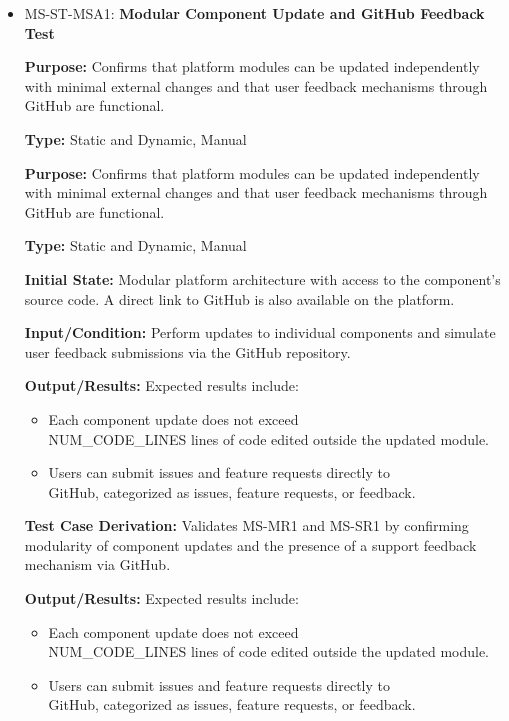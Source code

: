 \documentclass[12pt, titlepage]{article}
\begin{document}
\begin{itemize}
  \item MS-ST-MSA1: \textbf{Modular Component Update and GitHub Feedback Test}
  \begin{mdframed}[linewidth=0.5mm] 
    \textbf{Purpose:} Confirms that platform modules can be updated independently with minimal external changes and that user feedback mechanisms through GitHub are functional. \par
    \textbf{Type:} Static and Dynamic, Manual \par 
    \textbf{Purpose:} Confirms that platform modules can be updated independently with minimal external changes and that user feedback mechanisms through GitHub are functional. \par
    \textbf{Type:} Static and Dynamic, Manual \par 
    \textbf{Initial State:} Modular platform architecture with access to the component’s source code. A direct link to GitHub is also available on the platform. \par 
    \textbf{Input/Condition:} Perform updates to individual components and simulate user feedback submissions via the GitHub repository. \par 
    \textbf{Output/Results:} Expected results include: 
    \begin{itemize} 
      \item Each component update does not exceed \\NUM\_CODE\_LINES lines of code edited outside the updated module.
      \item Users can submit issues and feature requests directly to \\GitHub, categorized as issues, feature requests, or feedback.
    \end{itemize} \par
    \textbf{Test Case Derivation:} Validates MS-MR1 and MS-SR1 by confirming modularity of component updates and the presence of a support feedback mechanism via GitHub. \par
    \textbf{Output/Results:} Expected results include: 
    \begin{itemize} 
      \item Each component update does not exceed \\NUM\_CODE\_LINES lines of code edited outside the updated module.
      \item Users can submit issues and feature requests directly to \\GitHub, categorized as issues, feature requests, or feedback.
    \end{itemize} \par

\end{mdframed}
\end{itemize}
\end{document}
